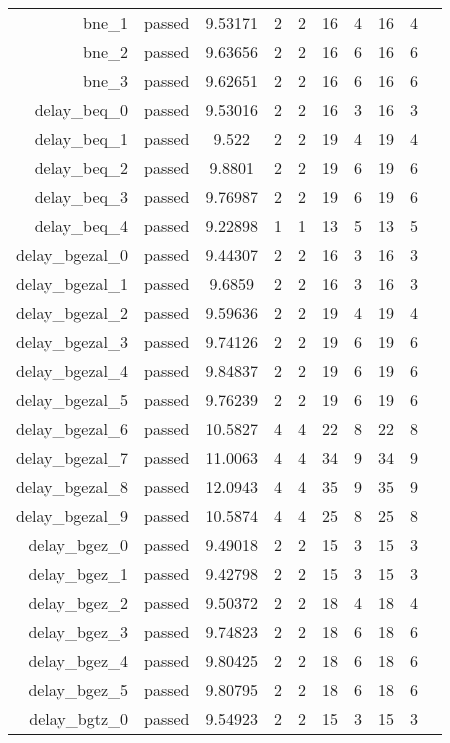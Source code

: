 \begin{longtable}{r|ccccccccc}
    bne\_1 & passed & 9.53171 & 2 & 2 & 16 & 4 & 16 & 4 \\
    bne\_2 & passed & 9.63656 & 2 & 2 & 16 & 6 & 16 & 6 \\
    bne\_3 & passed & 9.62651 & 2 & 2 & 16 & 6 & 16 & 6 \\
    delay\_beq\_0 & passed & 9.53016 & 2 & 2 & 16 & 3 & 16 & 3 \\
    delay\_beq\_1 & passed & 9.522 & 2 & 2 & 19 & 4 & 19 & 4 \\
    delay\_beq\_2 & passed & 9.8801 & 2 & 2 & 19 & 6 & 19 & 6 \\
    delay\_beq\_3 & passed & 9.76987 & 2 & 2 & 19 & 6 & 19 & 6 \\
    delay\_beq\_4 & passed & 9.22898 & 1 & 1 & 13 & 5 & 13 & 5 \\
    delay\_bgezal\_0 & passed & 9.44307 & 2 & 2 & 16 & 3 & 16 & 3 \\
    delay\_bgezal\_1 & passed & 9.6859 & 2 & 2 & 16 & 3 & 16 & 3 \\
    delay\_bgezal\_2 & passed & 9.59636 & 2 & 2 & 19 & 4 & 19 & 4 \\
    delay\_bgezal\_3 & passed & 9.74126 & 2 & 2 & 19 & 6 & 19 & 6 \\
    delay\_bgezal\_4 & passed & 9.84837 & 2 & 2 & 19 & 6 & 19 & 6 \\
    delay\_bgezal\_5 & passed & 9.76239 & 2 & 2 & 19 & 6 & 19 & 6 \\
    delay\_bgezal\_6 & passed & 10.5827 & 4 & 4 & 22 & 8 & 22 & 8 \\
    delay\_bgezal\_7 & passed & 11.0063 & 4 & 4 & 34 & 9 & 34 & 9 \\
    delay\_bgezal\_8 & passed & 12.0943 & 4 & 4 & 35 & 9 & 35 & 9 \\
    delay\_bgezal\_9 & passed & 10.5874 & 4 & 4 & 25 & 8 & 25 & 8 \\
    delay\_bgez\_0 & passed & 9.49018 & 2 & 2 & 15 & 3 & 15 & 3 \\
    delay\_bgez\_1 & passed & 9.42798 & 2 & 2 & 15 & 3 & 15 & 3 \\
    delay\_bgez\_2 & passed & 9.50372 & 2 & 2 & 18 & 4 & 18 & 4 \\
    delay\_bgez\_3 & passed & 9.74823 & 2 & 2 & 18 & 6 & 18 & 6 \\
    delay\_bgez\_4 & passed & 9.80425 & 2 & 2 & 18 & 6 & 18 & 6 \\
    delay\_bgez\_5 & passed & 9.80795 & 2 & 2 & 18 & 6 & 18 & 6 \\
    delay\_bgtz\_0 & passed & 9.54923 & 2 & 2 & 15 & 3 & 15 & 3 \\

\end{longtable}
